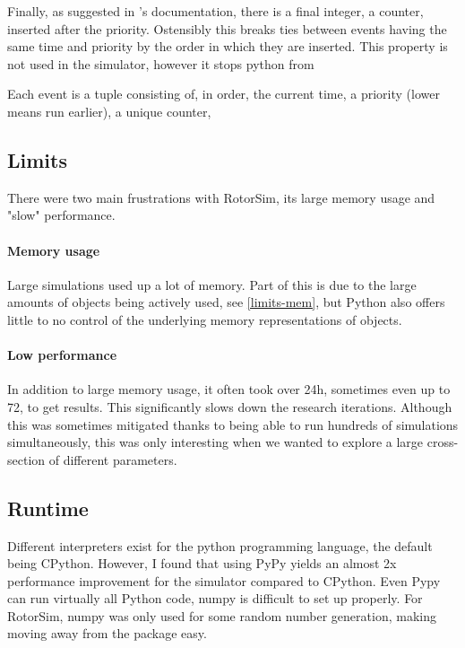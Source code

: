 Finally, as suggested in 's documentation, there is a final integer, a counter, inserted after the priority. Ostensibly this breaks ties between events having the same time and priority by the order in which they are inserted.
This property is not used in the simulator, however it stops python from 

Each event is a tuple consisting of, in order, the current time, a priority (lower means run earlier), a unique counter, 



\subsection{Limits} \label{rotorsim-limits}

There were two main frustrations with RotorSim, its large memory usage and "slow" performance.

\paragraph{Memory usage} \label{rotorsim-mem}
Large simulations used up a lot of memory.
Part of this is due to the large amounts of objects being actively used, see \ref{limits-mem}, but Python also offers little to no control of the underlying memory representations of objects.

\paragraph{Low performance} \label{rotorsim-perf}
In addition to large memory usage, it often took over 24h, sometimes even up to 72, to get results.
This significantly slows down the research iterations.
Although this was sometimes mitigated thanks to being able to run hundreds of simulations simultaneously, this was only interesting when we wanted to explore a large cross-section of different parameters.



\subsection{Runtime} \label{rotorsim-runtime}

Different interpreters exist for the python programming language, the default being CPython.
However, I found that using PyPy \cite{team_pypy_2019} yields an almost 2x performance improvement for the simulator compared to CPython.
Even Pypy can run virtually all Python code, numpy \cite{van_der_walt_numpy_2011} is difficult to set up properly.
For RotorSim, numpy was only used for some random number generation, making moving away from the package easy.









